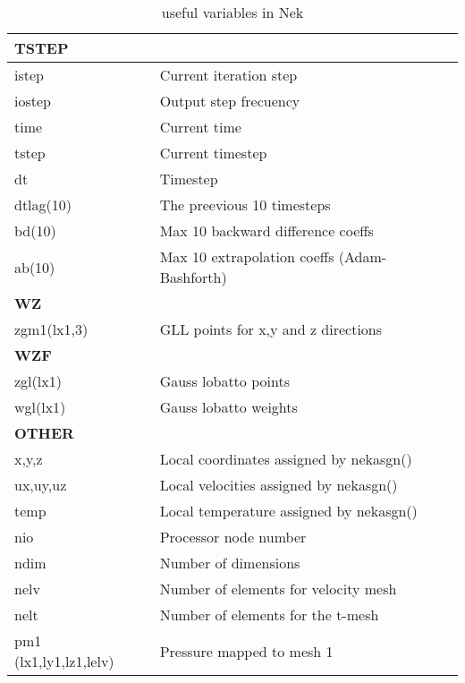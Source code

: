 \begin{table}
\begin{tabular}{l l}
\multicolumn{2}{l}{\textbf{TSTEP}}\\ \hline
istep                            & Current iteration step\\
iostep                           & Output step frecuency\\
time                             & Current time\\
tstep                            & Current timestep	\\
dt                               & Timestep\\
dtlag(10)                        & The preevious 10 timesteps\\
bd(10)                           & Max 10 backward difference coeffs\\
ab(10)                           & Max 10 extrapolation coeffs (Adam-Bashforth)\\

\multicolumn{2}{l}{\textbf{WZ}}\\ \hline
zgm1(lx1,3)                      & GLL points for x,y and z directions \\

\multicolumn{2}{l}{\textbf{WZF}}\\ \hline            
zgl(lx1)                         & Gauss lobatto points\\
wgl(lx1)                         & Gauss lobatto weights\\

\multicolumn{2}{l}{\textbf{OTHER}}\\ \hline            
x,y,z                            & Local coordinates assigned by nekasgn()\\
ux,uy,uz                         & Local velocities assigned by nekasgn()\\
temp                             & Local temperature assigned by nekasgn()\\
nio                              & Processor node number  \\
ndim                             & Number of dimensions\\
nelv                             & Number of elements for velocity mesh\\
nelt                             & Number of elements for the t-mesh\\
pm1 (lx1,ly1,lz1,lelv)           & Pressure mapped to mesh 1\\






        
    \end{tabular}
    \caption{useful variables in Nek}
    \label{tab:variables}
\end{table}

